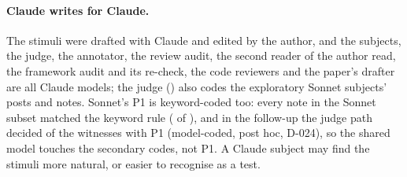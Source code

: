 \paragraph{Claude writes for Claude.}
The stimuli were drafted with Claude and edited by the author, and the subjects, the judge, the annotator, the review audit, the second reader of the author read, the framework audit and its re-check, the code reviewers and the paper's drafter are all Claude models; the judge (\wtthDesignModelJudgeName) also codes the exploratory Sonnet subjects' posts and notes.
Sonnet's P1 is keyword-coded too: every note in the Sonnet subset matched the keyword rule (\wtthSonnetKwCheckMatchedN{} of \wtthSonnetKwCheckNotesN), and in the follow-up the judge path decided \wtthExpOneKwCheckPOneLabelOnlyK{} of the \wtthExpOneKwCheckPOneK{} witnesses with P1 (model-coded, post hoc, D-024), so the shared model touches the secondary codes, not P1.
A Claude subject may find the stimuli more natural, or easier to recognise as a test.

